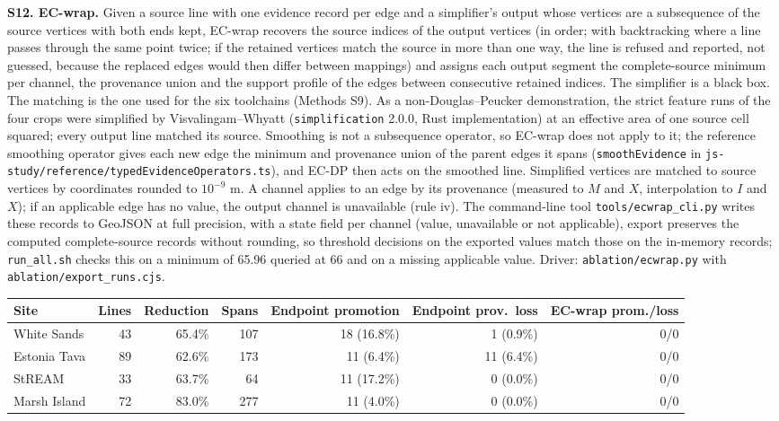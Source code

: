 \documentclass[11pt]{article}
\begin{document}
\vspace{4mm}
\noindent\textbf{S12. EC-wrap.} Given a source line with one evidence record per edge and a simplifier's output whose vertices are a subsequence of the source vertices with both ends kept, EC-wrap recovers the source indices of the output vertices (in order; with backtracking where a line passes through the same point twice; if the retained vertices match the source in more than one way, the line is refused and reported, not guessed, because the replaced edges would then differ between mappings) and assigns each output segment the complete-source minimum per channel, the provenance union and the support profile of the edges between consecutive retained indices. The simplifier is a black box. The matching is the one used for the six toolchains (Methods S9). As a non-Douglas--Peucker demonstration, the strict feature runs of the four crops were simplified by Visvalingam--Whyatt (\texttt{simplification} 2.0.0, Rust implementation) at an effective area of one source cell squared; every output line matched its source. Smoothing is not a subsequence operator, so EC-wrap does not apply to it; the reference smoothing operator gives each new edge the minimum and provenance union of the parent edges it spans (\texttt{smoothEvidence} in \texttt{js-study/reference/typedEvidenceOperators.ts}), and EC-DP then acts on the smoothed line. Simplified vertices are matched to source vertices by coordinates rounded to $10^{-9}$ m. A channel applies to an edge by its provenance (measured to $M$ and $X$, interpolation to $I$ and $X$); if an applicable edge has no value, the output channel is unavailable (rule iv). The command-line tool \texttt{tools/ecwrap\_cli.py} writes these records to GeoJSON at full precision, with a state field per channel (value, unavailable or not applicable), export preserves the computed complete-source records without rounding, so threshold decisions on the exported values match those on the in-memory records; \texttt{run\_all.sh} checks this on a minimum of 65.96 queried at 66 and on a missing applicable value. Driver: \texttt{ablation/ecwrap.py} with \texttt{ablation/export\_runs.cjs}.

\begin{center}\scriptsize
\begin{tabular}{@{}lrrrrrr@{}}
\toprule
Site & Lines & Reduction & Spans & Endpoint promotion & Endpoint prov.\ loss & EC-wrap prom./loss \\
\midrule
White Sands & 43 & 65.4\% & 107 & 18 (16.8\%) & 1 (0.9\%) & 0/0 \\
Estonia Tava & 89 & 62.6\% & 173 & 11 (6.4\%) & 11 (6.4\%) & 0/0 \\
StREAM & 33 & 63.7\% & 64 & 11 (17.2\%) & 0 (0.0\%) & 0/0 \\
Marsh Island & 72 & 83.0\% & 277 & 11 (4.0\%) & 0 (0.0\%) & 0/0 \\
\bottomrule
\end{tabular}
\end{center}
\end{document}
